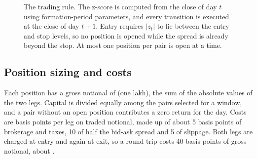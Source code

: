 \documentclass[11pt]{article}
\begin{document}
\begin{figure}[tbp]
\centering
{}
\caption{The trading rule. The z-score is computed from the close of day $t$ using
formation-period parameters, and every transition is executed at the close of day
$t+1$. Entry requires $|z_t|$ to lie between the entry and stop levels, so no
position is opened while the spread is already beyond the stop. At most one
position per pair is open at a time.}
\label{fig:rule}
\end{figure}

\subsection{Position sizing and costs}

Each position has a gross notional of \rupee\Capital{} (one lakh), the sum of the absolute values
of the two legs. Capital is divided equally among the pairs selected for a window,
and a pair without an open position contributes a zero return for the day. Costs
are \BpsLeg{} basis points per leg on traded notional, made up of about 5 basis
points of brokerage and taxes, 10 of half the bid-ask spread and 5 of slippage. Both
legs are charged at entry and again at exit, so a round trip costs 40 basis points
of gross notional, about .
\end{document}
